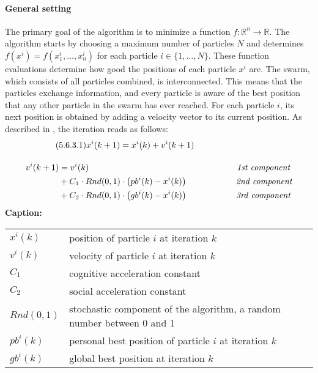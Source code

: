 \paragraph{General setting}
The primary goal of the algorithm is to minimize a function $f: \mathbb{R}^n \longrightarrow \mathbb{R}.$ The algorithm starts by choosing a maximum number of particles $N$ and determines $f(x^{i}) = f(x_{1}^{i},\ldots,x_{n}^{i})$ for each particle $i \in \{1,\ldots,N\}.$ These function evaluations determine how good the positions of each particle $x^{i}$ are.
The swarm, which consists of all particles combined, is interconnected. This means that the particles exchange information, and every particle is aware of the best position that any other particle in the swarm has ever reached. For each particle $i$, its next position is obtained by adding a velocity vector to its current position. As described in \cite[2]{PSO}, the iteration reads as follows:
\begin{gather*}\tag{5.6.3.1}
x^{i}(k + 1) = x^{i}(k) + v^{i}(k+1)\hspace{3.5cm}\\
\rule{0pt}{3.5em} %
\begin{aligned}
v^{i}(k+1) &= v^{i}(k) \hspace{6.095cm}\textit{1st component}\\ 
&+ C_{1} \cdot Rnd(0, 1) \cdot \left(pb^{i}(k) - x^{i}(k)\right) \hspace{2cm}\textit{2nd component}\\
&+ C_{2} \cdot Rnd(0, 1) \cdot \left(gb^{i}(k) - x^{i}(k)\right) \hspace{2cm}\textit{3rd component}
\end{aligned}
\end{gather*}
\textbf{Caption:}\\
\rule{0pt}{4.5em} %
\begin{tabular}{ll}
$x^{i}(k)$ & position of particle $i$ at iteration $k$\\
$v^{i}(k)$ & velocity of particle $i$ at iteration $k$\\
$C_{1}$ & cognitive acceleration constant\\
$C_{2}$ & social acceleration constant\\
$Rnd(0, 1)$ & stochastic component of the algorithm, a random number between 0 and 1\\
$pb^{i}(k)$ & personal best position of particle $i$ at iteration $k$\\
$gb^{i}(k)$ & global best position at iteration $k$
\end{tabular}\\
